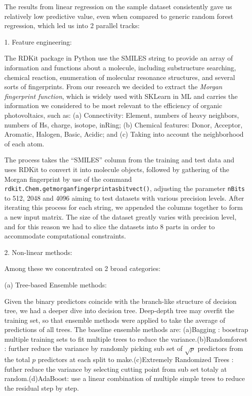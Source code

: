 \documentclass[11pt]{article}
\begin{document}
The results from linear regression on the sample dataset consistently gave us relatively low predictive value, even when compared to generic random forest regression, which led us into 2 parallel tracks:


1. Feature engineering: 

The RDKit package in Python use the SMILES string to provide an array of information and functions about a molecule, including substructure searching, chemical reaction, enumeration of molecular resonance structures, and several sorts of fingerprints. From our research we decided to extract the \emph{Morgan fingerprint function}, which is widely used with SKLearn in ML and carries the information we considered to be most relevant to the efficiency of organic photovoltaics, such as: (a) Connectivity: Element, numbers of heavy neighbors, numbers of Hs, charge, isotope, inRing; (b) Chemical features: Donor, Acceptor, Aromatic, Halogen, Basic, Acidic; and (c) Taking into account the neighborhood of each atom.

The process takes the ``SMILES'' column from the training and test data and uses RDKit to convert it into molecule objects, followed by gathering of the Morgan fingerprint by use of the command \verb|rdkit.Chem.getmorganfingerprintasbitvect()|, adjusting the parameter \verb|nBits| to 512, 2048 and 4096 aiming to test datasets with various precision levels. After iterating this process for each string, we appended the columns together to form a new input matrix. The size of the dataset greatly varies with precision level, and for this reason we had to slice the datasets into 8 parts in order to accommodate computational constraints.

2. Non-linear methods: 

Among these we concentrated on 2 broad categories:


(a) Tree-based Ensemble methods: 

Given the binary predictors coincide with the branch-like structure of decision tree, we had a deeper dive into decision tree. Deep-depth tree may overfit the training set,  so that ensemble methods were applied to take the average of predictions of all trees. The baseline ensemble methods are:
(a)Bagging : boostrap multiple training sets to fit multiple trees to reduce the variance.(b)Randomforest : further reduce the variance by randomly picking sub set of $\sqrt{p}$ predictors from the total $\mathit{p}$ predictors at each split to make.(c)Extremely Randomized Trees : futher reduce the variance by selecting cutting point from sub set totaly at random.(d)AdaBoost: use a linear combination of multiple simple trees to reduce the residual step by step.
\end{document}
